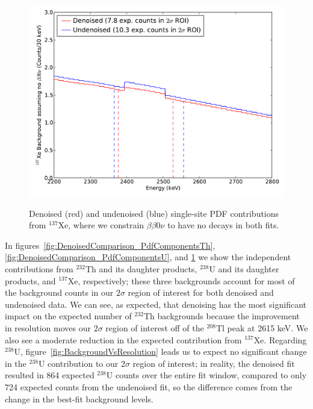 \begin{figure}
\begin{center}
\includegraphics[keepaspectratio=true,width=\textwidth]{DenoisedVsUndenoised_SSPdf_Xe137Only.pdf}
\end{center}
\renewcommand{\baselinestretch}{1}
\small\normalsize
\begin{quote}
\caption{Denoised (red) and undenoised (blue) single-site PDF contributions from $^{137}$Xe, where we constrain $\beta\beta 0\nu$ to have no decays in both fits.}
\label{fig:DenoisedComparison_PdfComponentsXe137}
\end{quote}
\end{figure}
\renewcommand{\baselinestretch}{2}
\small\normalsize

In figures~\ref{fig:DenoisedComparison_PdfComponentsTh}, \ref{fig:DenoisedComparison_PdfComponentsU}, and \ref{fig:DenoisedComparison_PdfComponentsXe137} we show the independent contributions from $^{232}$Th and its daughter products, $^{238}$U and its daughter products, and $^{137}$Xe, respectively; these three backgrounds account for most of the background counts in our $2\sigma$ region of interest for both denoised and undenoised data.  We can see, as expected, that denoising has the most significant impact on the expected number of $^{232}$Th backgrounds because the improvement in resolution moves our $2\sigma$ region of interest off of the $^{208}$Tl peak at 2615 keV.  We also see a moderate reduction in the expected contribution from $^{137}$Xe.  Regarding $^{238}$U, figure~\ref{fig:BackgroundVsResolution} leads us to expect no significant change in the $^{238}$U contribution to our $2\sigma$ region of interest; in reality, the denoised fit resulted in 864 expected $^{238}$U counts over the entire fit window, compared to only 724 expected counts from the undenoised fit, so the difference comes from the change in the best-fit background levels.

